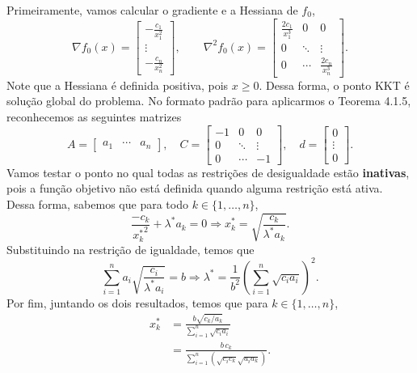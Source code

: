 \begin{questions}
\setcounter{question}{7}
\begin{solution}
    Primeiramente, vamos calcular o gradiente e a Hessiana de $f_0$,
    \[    
    \nabla f_0(x) = 
    \begin{bmatrix}
        -\frac{c_1}{x_1^2}\\
        \vdots\\
        -\frac{c_n}{x_n^2}
    \end{bmatrix},\qquad
    \nabla^2 f_0(x) = 
    \begin{bmatrix}
        \frac{2c_1}{x_1^3} & 0 & 0\\
        0 & \ddots & \vdots\\
        0 & \cdots & \frac{2c_n}{x_n^3}
    \end{bmatrix}.
    \]
    Note que a Hessiana é definida positiva, pois $x\ge 0$. Dessa forma, o ponto KKT é solução global do problema.
    No formato padrão para aplicarmos o Teorema 4.1.5, reconhecemos as seguintes matrizes
    \[
    A =
    \begin{bmatrix}
        a_1 & \cdots & a_n
    \end{bmatrix}, \quad
    C = 
    \begin{bmatrix}
        -1 & 0 & 0\\
        0 & \ddots & \vdots\\
        0 & \cdots & -1
    \end{bmatrix}, \quad
    d =
    \begin{bmatrix}
        0 \\ \vdots\\ 0
    \end{bmatrix}.
    \]
    Vamos testar o ponto no qual todas as restrições de desigualdade estão \textbf{inativas}, pois a função objetivo não está definida quando alguma restrição está ativa. Dessa forma, sabemos que para todo $k\in\{1,\dots,n\}$,
    \[
        \frac{-c_k}{{x^*_k}^2} + \lambda^* a_k = 0
        \Rightarrow \boxed{ x^*_k = \sqrt{\frac{c_k}{\lambda^* a_k}} }.
    \]
    Substituindo na restrição de igualdade, temos que
    \[
        \sum_{i=1}^n a_i\sqrt{\frac{c_i}{\lambda^* a_i}} = b
        \Rightarrow \boxed{ \lambda^* = \frac{1}{b^2}\left(\sum_{i=1}^n\sqrt{c_i a_i}\right)^2 }.
    \]
    Por fim, juntando os dois resultados, temos que para $k\in\{1,\dots,n\}$,
    \begin{align*}
        x_k^* &= \frac{b\sqrt{c_k/a_k}}{\sum_{i=1}^n\sqrt{c_i a_i}} \\
            &= \frac{b\,c_k}{\sum_{i=1}^n(\sqrt{c_i c_k}\sqrt{a_i a_k})}.
    \end{align*}
\end{solution}

\end{questions}
